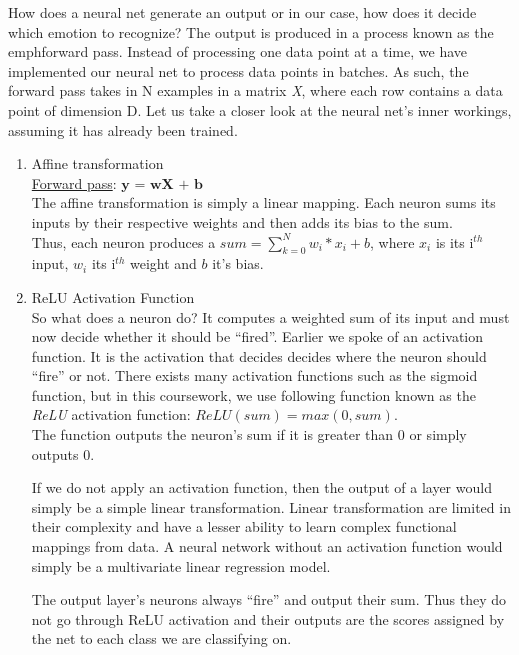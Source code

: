 How does a neural net generate an output or in our case, how does it decide which emotion to recognize?
The output is produced in a process known as the emph{forward pass}.
Instead of processing one data point at a time,
we have implemented our neural net to process data points in batches.
As such, the forward pass takes in N examples in a matrix \emph{X}, where each row contains a data point of dimension D.
Let us take a closer look at the neural net's inner workings, assuming it has already been trained.

\begin{enumerate}
   \item Affine transformation\\
     \underline{Forward pass}: $\textbf{y = wX + b}$\\
     The affine transformation is simply a linear mapping.
     Each neuron sums its inputs by their respective weights and then adds its bias to the sum.\\
     Thus, each neuron produces a $sum = \sum_{k=0}^{N} w_i * x_i + b$,
     where $x_i$ is its i$^{th}$ input, $w_i$ its i$^{th}$ weight and $b$ it's bias.
     
   \item ReLU Activation Function\\
     So what does a neuron do? It computes a weighted sum of its input and must now decide whether it should be ``fired''.
     Earlier we spoke of an activation function.
     It is the activation that decides decides where the neuron should ``fire'' or not. 
     There exists many activation functions such as the sigmoid function,
     but in this coursework, we use following function known as the \emph{ReLU} activation function:
     $ReLU(sum) = max(0,sum)$.\\
     The function outputs the neuron's sum if it is greater than 0 or simply outputs 0.
     
     If we do not apply an activation function, then the output of a layer would simply be a simple linear transformation.
     Linear transformation are limited in their complexity and have a lesser ability to learn complex functional mappings from data.
     A neural network without an activation function would simply be a multivariate linear regression model.

     The output layer's neurons always ``fire'' and output their sum.
     Thus they do not go through ReLU activation and
     their outputs are the scores assigned by the net to each class we are classifying on.
     
\end{enumerate}

